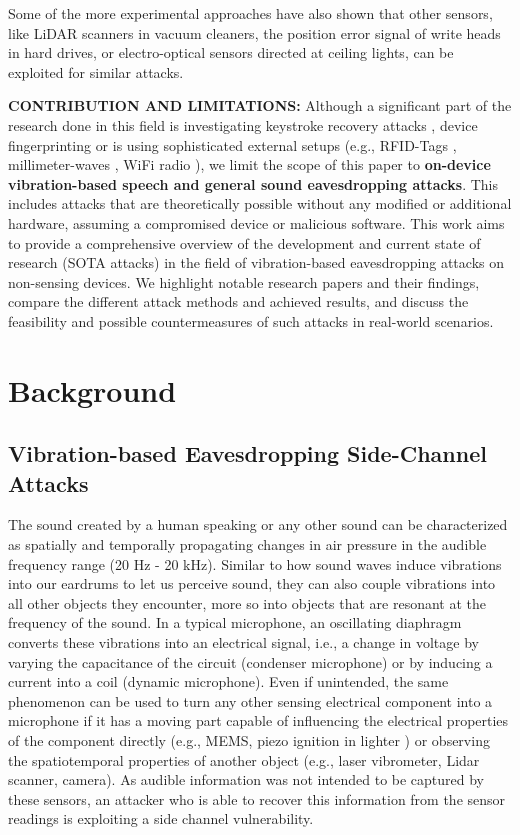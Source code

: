 \documentclass[sigconf, nonacm]{acmart}
\begin{document}
Some of the more experimental approaches have also shown that other sensors, like LiDAR scanners in vacuum cleaners, the position error signal of write heads in hard drives, or electro-optical sensors directed at ceiling lights, can be exploited for similar attacks.
\\
\begin{sloppypar}
\noindent
\textbf{CONTRIBUTION AND LIMITATIONS:} Although a significant part of the research done in this field is investigating keystroke recovery attacks \cite{Touchtone2023}\cite{TouchLogger2011}\cite{TapLogger2012}, device fingerprinting \cite{AccelerometerFingerprinting2016}\cite{MEMSFingerprinting2013} or is using sophisticated external setups (e.g., RFID-Tags \cite{RFMic2023}, millimeter-waves \cite{MMMic2022}, WiFi radio \cite{ART2015}), we limit the scope of this paper to \textbf{on-device vibration-based speech and general sound eavesdropping attacks}.
This includes attacks that are theoretically possible without any modified or additional hardware, assuming a compromised device or malicious software.
This work aims to provide a comprehensive overview of the development and current state of research (SOTA attacks) in the field of vibration-based eavesdropping attacks on non-sensing devices.
We highlight notable research papers and their findings, compare the different attack methods and achieved results, and discuss the feasibility and possible countermeasures of such attacks in real-world scenarios.
\end{sloppypar}

\section{Background}
\subsection{Vibration-based Eavesdropping Side-Channel Attacks}
The sound created by a human speaking or any other sound can be characterized as spatially and temporally propagating changes in air pressure in the audible frequency range (20 Hz - 20 kHz).
Similar to how sound waves induce vibrations into our eardrums to let us perceive sound, they can also couple vibrations into all other objects they encounter, more so into objects that are resonant at the frequency of the sound.
In a typical microphone, an oscillating diaphragm converts these vibrations into an electrical signal, i.e., a change in voltage by varying the capacitance of the circuit (condenser microphone) or by inducing a current into a coil (dynamic microphone).
Even if unintended, the same phenomenon can be used to turn any other sensing electrical component into a microphone if it has a moving part capable of influencing the electrical properties of the component directly (e.g., MEMS, piezo ignition in lighter \cite{ElectroboomLighterMicrophone}) or observing the spatiotemporal properties of another object (e.g., laser vibrometer, Lidar scanner, camera).
As audible information was not intended to be captured by these sensors, an attacker who is able to recover this information from the sensor readings is exploiting a side channel vulnerability.
\end{document}
